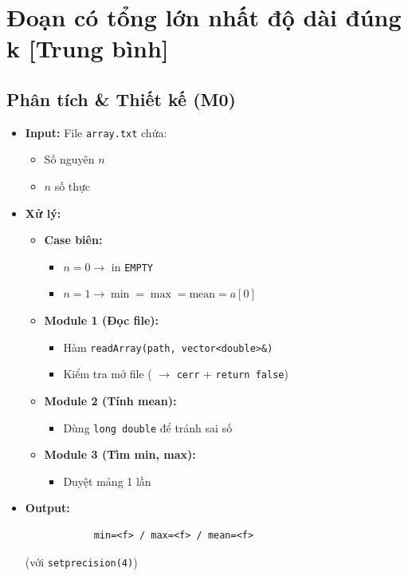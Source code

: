 \section{Đoạn có tổng lớn nhất độ dài đúng k [Trung bình]}
\subsection{Phân tích \& Thiết kế (M0)}
    \begin{itemize}
    \item \textbf{Input:}
    File \texttt{array.txt} chứa:
    \begin{itemize}
        \item Số nguyên $n$
        \item $n$ số thực
    \end{itemize}

    \item \textbf{Xử lý:}
        \begin{itemize}
            \item \textbf{Case biên:}
            \begin{itemize}
                \item $n = 0 \rightarrow$ in \texttt{EMPTY}
                \item $n = 1 \rightarrow \min = \max = \text{mean} = a[0]$
            \end{itemize}
            
            \item \textbf{Module 1 (Đọc file):}
            \begin{itemize}
                \item Hàm \texttt{readArray(path, vector<double>\&)}
                \item Kiểm tra mở file ( $\rightarrow$ \texttt{cerr} + \texttt{return false})
            \end{itemize}
            
            \item \textbf{Module 2 (Tính mean):}
            \begin{itemize}
                \item Dùng \texttt{long double} để tránh sai số
            \end{itemize}
            
            \item \textbf{Module 3 (Tìm min, max):}
            \begin{itemize}
                \item Duyệt mảng 1 lần
            \end{itemize}
        \end{itemize}

        \item \textbf{Output:}
        \begin{lstlisting}
            min=<f> / max=<f> / mean=<f>\end{lstlisting} 
        (với \texttt{setprecision(4)})
    \end{itemize}

